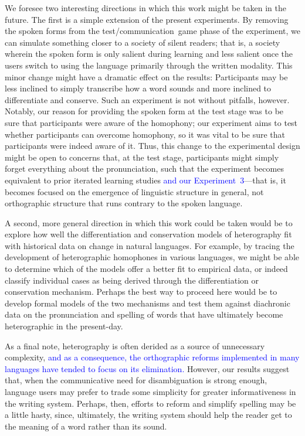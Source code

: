 \documentclass[doc,biblatex]{apa7}
\newcommand\newmaterial[1]{\textcolor{blue}{#1}}
\begin{document}
We foresee two interesting directions in which this work might be taken in the future. The first is a simple extension of the present experiments. By removing the spoken forms from the test/communication~game phase of the experiment, we can simulate something closer to a society of silent readers; that is, a society wherein the spoken form is only salient during learning and less salient once the users switch to using the language primarily through the written modality. This minor change might have a dramatic effect on the results: Participants may be less inclined to simply transcribe how a word sounds and more inclined to differentiate and conserve. Such an experiment is not without pitfalls, however. Notably, our reason for providing the spoken form at the test stage was to be sure that participants were aware of the homophony; our experiment aims to test whether participants can overcome homophony, so it was vital to be sure that participants were indeed aware of it. Thus, this change to the experimental design might be open to concerns that, at the test stage, participants might simply forget everything about the pronunciation, such that the experiment becomes equivalent to prior iterated learning studies \newmaterial{and our Experiment~3}---that is, it becomes focused on the emergence of linguistic structure in general, not orthographic structure that runs contrary to the spoken language. 

A second, more general direction in which this work could be taken would be to explore how well the differentiation and conservation models of heterography fit with historical data on change in natural languages. For example, by tracing the development of heterographic homophones in various languages, we might be able to determine which of the models offer a better fit to empirical data, or indeed classify individual cases as being derived through the differentiation or conservation mechanism. Perhaps the best way to proceed here would be to develop formal models of the two mechanisms and test them against diachronic data on the pronunciation and spelling of words that have ultimately become heterographic in the present-day.

As a final note, heterography is often derided as a source of unnecessary complexity, \newmaterial{and as a consequence, the orthographic reforms implemented in many languages have tended to focus on its elimination.} However, our results suggest that, when the communicative need for disambiguation is strong enough, language users may prefer to trade some simplicity for greater informativeness in the writing system. Perhaps, then, efforts to reform and simplify spelling may be a little hasty, since, ultimately, the writing system should help the reader get to the meaning of a word rather than its sound.
\end{document}
